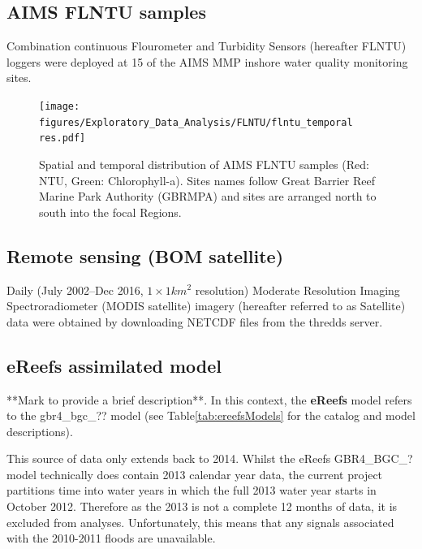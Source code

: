 \documentclass[a4paper]{AIMSreport}
\begin{document}


\clearpage

\subsection{AIMS FLNTU samples}
  
Combination continuous Flourometer and Turbidity Sensors (hereafter FLNTU) loggers were deployed at
15 of the AIMS MMP inshore water quality monitoring sites.
 
 

\begin{figure}[ptbh] \texttt{[image: figures/Exploratory\_Data\_Analysis/FLNTU/flntu\_temporal\\res.pdf]}
\caption{Spatial and temporal distribution of AIMS FLNTU samples (Red: NTU, Green: Chlorophyll-a).
Sites names follow Great Barrier Reef Marine Park Authority (GBRMPA) and sites are arranged north to
south into the focal Regions.}\label{fig:flntu_temporal}
\end{figure}

\clearpage

\subsection{Remote sensing (BOM satellite)}

Daily (July 2002--Dec 2016, $1\times 1 km^2$ resolution) Moderate Resolution Imaging
Spectroradiometer (MODIS satellite) imagery (hereafter referred to as Satellite) data were obtained
by downloading NETCDF files from the thredds server.



 

\subsection{eReefs assimilated model}

**Mark to provide a brief description**. In this context, the \textbf{eReefs} model refers to the
gbr4\_bgc\_?? model (see Table\ref{tab:ereefsModels} for the catalog and model descriptions).

This source of data only extends back to 2014. Whilst the eReefs GBR4\_BGC\_? model technically does
contain 2013 calendar year data, the current project partitions time into water years in which the
full 2013 water year starts in October 2012.  Therefore as the 2013 is not a complete 12 months of
data, it is excluded from analyses. Unfortunately, this means that any signals associated with the
2010-2011 floods are unavailable.
 
\end{document}
